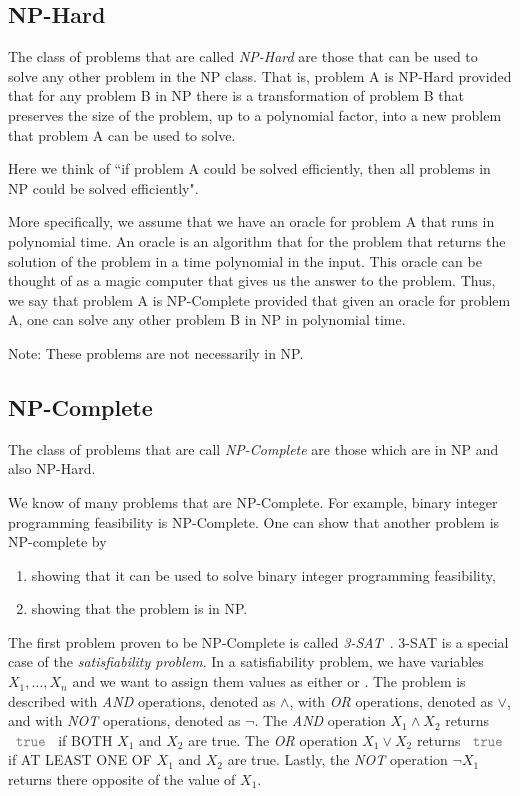 \subsection{NP-Hard}
The class of problems that are called \emph{NP-Hard} are those that can be used to solve any other problem in the NP class.  
That is, problem A is NP-Hard provided that for any problem B in NP there is a transformation of problem B that preserves the size of the problem, up to a polynomial factor, into a new problem that problem A can be used to solve.

Here we think of ``if problem A could be solved efficiently, then all problems in NP could be solved efficiently".

More specifically, we assume that we have an oracle for problem A that runs in polynomial time.  An oracle is an algorithm that for the problem that returns the solution of the problem in a time polynomial in the input.   This oracle can be thought of as a magic computer that gives us the answer to the problem.   
Thus, we say that problem A is NP-Complete provided that given an oracle for problem A, one can solve any other problem B in NP in polynomial time.

Note:  These problems are not necessarily in NP.

\subsection{NP-Complete}
The class of problems that are call \emph{NP-Complete} are those which are in NP and also NP-Hard.  

We know of many problems that are NP-Complete.  For example, binary integer programming feasibility is NP-Complete.  One can show that another problem is NP-complete by 
\begin{enumerate}
\item showing that it can be used to solve binary integer programming feasibility,
\item showing that the problem is in NP.
\end{enumerate}

The first problem proven to be NP-Complete is called \emph{3-SAT}~\cite{}.  3-SAT is a special case of the \emph{satisfiability problem}.   In a satisfiability problem, we have variables $X_1, \dots, X_n$ and we want to assign them values as either \true or \false.  The problem is described with \emph{AND} operations, denoted as $\land$,  with \emph{OR} operations, denoted as $\lor$, and with \emph{NOT} operations, denoted as $\neg$.  The \emph{AND} operation $X_1 \land X_2$ returns $\true$ if BOTH $X_1$ and $X_2$ are true.  The \emph{OR} operation $X_1 \lor X_2$ returns $\true$ if AT LEAST ONE OF  $X_1$ and $X_2$ are true.  Lastly, the \emph{NOT} operation $\neg X_1$ returns there opposite of the value of $X_1$.

